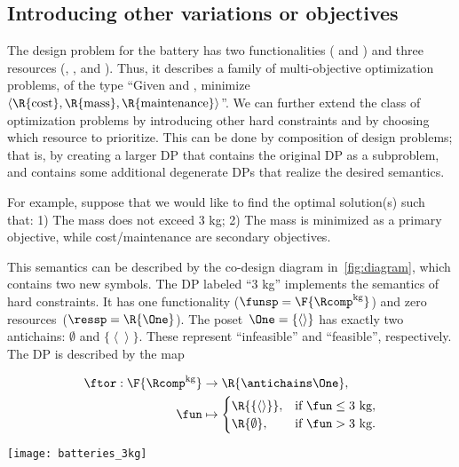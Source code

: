 \subsection{Introducing other variations or objectives}

The design problem for the battery has two functionalities (
and ) and three resources (, ,
and ). Thus, it describes a family of multi-objective
optimization problems, of the type ``Given  and ,
minimize $\left\langle \R{\text{cost}},\R{\text{mass}},\R{\text{maintenance}}\right\rangle $''.
We can further extend the class of optimization problems by introducing
other hard constraints and by choosing which resource to prioritize.
This can be done by composition of design problems; that is, by creating
a larger DP that contains the original DP as a subproblem, and contains
some additional degenerate DPs that realize the desired semantics.

For example, suppose that we would like to find the optimal solution(s)
such that: 1) The mass does not exceed 3 kg; 2) The mass is minimized
as a primary objective, while cost/maintenance are secondary objectives.

This semantics can be described by the co-design diagram in~\cref{fig:diagram},
which contains two new symbols. The DP labeled ``3 kg'' implements
the semantics of hard constraints. It has one functionality ($\funsp=\F{\Rcomp^{\text{kg}}}$)
and zero resources~($\ressp=\R{\One}$). The poset~$\One=\{\left\langle \right\rangle \}$
has exactly two antichains: $\emptyset$ and $\{\left\langle \right\rangle \}$.
These represent ``infeasible'' and ``feasible'', respectively.
The DP is described by the map

\quad\quad
\begin{minipage}[c]{5cm}
    \begin{align*}
        \ftor:\F{\Rcomp^{\text{kg}}} & \rightarrow\R{\antichains\One},\\
        \fun& \mapsto\begin{cases}
                         \R{\{\left\langle \right\rangle \}}, & \text{if }\fun\leq\text{3 kg},\\
                         \R{\emptyset}, & \text{if }\fun>\text{3 kg}.
        \end{cases}
    \end{align*}

\end{minipage}\quad\texttt{[image: batteries\_3kg]}

